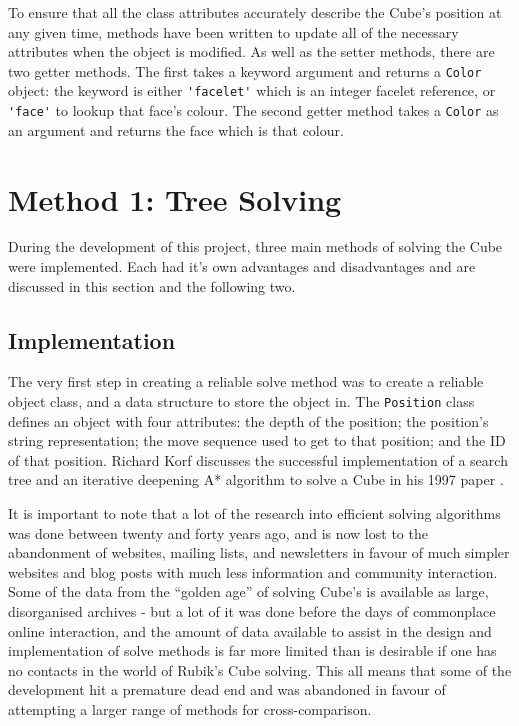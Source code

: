 \documentclass{report}
\newenvironment{aside}{\begin{mdframed}[style=0,%
		leftline=false,rightline=false,leftmargin=2em,rightmargin=2em,%
		innerleftmargin=0pt,innerrightmargin=0pt,linewidth=0.75pt,%
		skipabove=7pt,skipbelow=7pt]\small}
	{\end{mdframed}}
\begin{document}
    To ensure that all the class attributes accurately describe the Cube's position at any given time, methods have been written to update all of the necessary attributes when the object is modified. As well as the setter methods, there are two getter methods. The first takes a keyword argument and returns a \lstinline|Color| object: the keyword is either \lstinline|'facelet'| which is an integer facelet reference, or \lstinline|'face'| to lookup that face's colour. The second getter method takes a \lstinline|Color| as an argument and returns the face which is that colour.
    
    \section{Method 1: Tree Solving} \label{sec:treeSolving}
    
    During the development of this project, three main methods of solving the Cube were implemented. Each had it's own advantages and disadvantages and are discussed in this section and the following two.
    
    \subsection{Implementation} \label{sec:treeSolveImplementation}
    
    The very first step in creating a reliable solve method was to create a reliable object class, and a data structure to store the object in. The \lstinline|Position| class defines an object with four attributes: the depth of the position; the position's string representation; the move sequence used to get to that position; and the ID of that position. Richard Korf discusses the successful implementation of a search tree and an iterative deepening A* algorithm to solve a Cube in his 1997 paper \cite{Korf1997}. 
    
   	\begin{aside}
   		    It is important to note that a lot of the research into efficient solving algorithms was done between twenty and forty years ago, and is now lost to the abandonment of websites, mailing lists, and newsletters in favour of much simpler websites and blog posts with much less information and community interaction. Some of the data from the \enquote{golden age} of solving Cube's is available as large, disorganised archives  - but a lot of it was done before the days of commonplace online interaction, and the amount of data available to assist in the design and implementation of solve methods is far more limited than is desirable if one has no contacts in the world of Rubik's Cube solving. This all means that some of the development hit a premature dead end and was abandoned in favour of attempting a larger range of methods for cross-comparison.
   	\end{aside}
\end{document}
